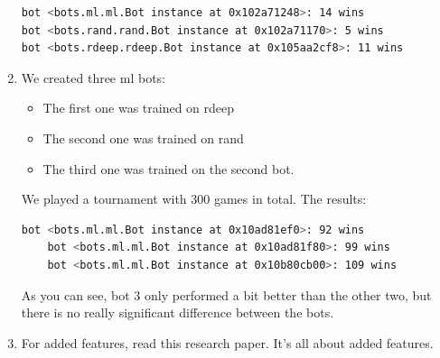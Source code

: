 \documentclass[a4paper,11pt]{article}
\begin{document}
\begin{enumerate}
\begin{lstlisting}[language=bash]
bot <bots.ml.ml.Bot instance at 0x102a71248>: 14 wins
bot <bots.rand.rand.Bot instance at 0x102a71170>: 5 wins
bot <bots.rdeep.rdeep.Bot instance at 0x105aa2cf8>: 11 wins
\end{lstlisting}

\item We created three ml bots:
\begin{itemize}
\item The first one was trained on rdeep
\item The second one was trained on rand
\item The third one was trained on the second bot.
\end{itemize}

We played a tournament with 300 games in total. The results:
\begin{lstlisting}[language=bash]
    bot <bots.ml.ml.Bot instance at 0x10ad81ef0>: 92 wins
    bot <bots.ml.ml.Bot instance at 0x10ad81f80>: 99 wins
    bot <bots.ml.ml.Bot instance at 0x10b80cb00>: 109 wins
\end{lstlisting}
As you can see, bot 3 only performed a bit better than the other two, but there is no really significant difference between the bots.

\item For added features, read this research paper. It's all about added features.

\end{enumerate}
\end{document}
